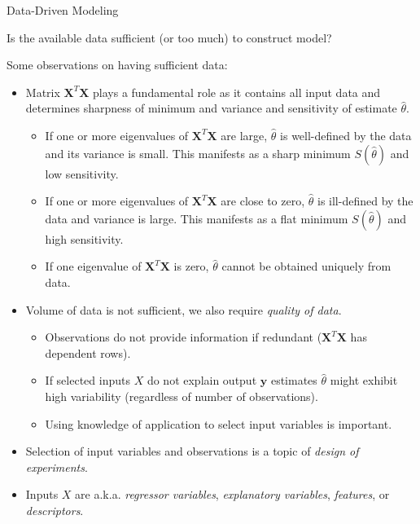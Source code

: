 \documentclass[9pt]{beamer}
\begin{document}
%
\begin{frame}{Data-Driven Modeling}

\begin{block}{}
Is the available data sufficient (or too much) to construct model?
\end{block}
Some observations on having sufficient data:
\begin{itemize}
\setlength{\itemsep}{5pt}
\item Matrix $\mathbf{X}^T\mathbf{X}$ plays a fundamental role as it contains all input data and determines  sharpness of minimum and variance and sensitivity of estimate $\hat{\theta}$. 

\begin{itemize}
\setlength{\itemsep}{5pt}
\item If one or more eigenvalues of $\mathbf{X}^T\mathbf{X}$ are large, $\hat{\theta}$ is well-defined by the data and its variance is small.  This manifests as a sharp minimum $S(\hat{\theta})$ and low sensitivity.
\item If one or more eigenvalues of $\mathbf{X}^T\mathbf{X}$ are close to zero, $\hat{\theta}$ is ill-defined by the data and variance is large. This manifests as a flat minimum $S(\hat{\theta})$ and high sensitivity.
\item If one eigenvalue of $\mathbf{X}^T\mathbf{X}$ is zero, $\hat{\theta}$ cannot be obtained uniquely from data.  
\end{itemize}
\item Volume of data is not sufficient, we also require {\em quality of data}. 

\begin{itemize}
\setlength{\itemsep}{5pt}
\item Observations do not provide information if redundant ($\mathbf{X}^T\mathbf{X}$ has dependent rows). 
\item If selected inputs $X$ do not explain output $\mathbf{y}$ estimates $\hat{\theta}$ might exhibit high variability (regardless of number of observations). 
\item Using knowledge of application to select input variables is important.  
\end{itemize}
\item Selection of input variables and observations is a topic of {\em design of experiments}. 
\item Inputs $X$ are a.k.a. {\em regressor variables}, {\em explanatory variables}, {\em features}, or {\em descriptors}. 
\end{itemize}

\end{frame}
\end{document}
